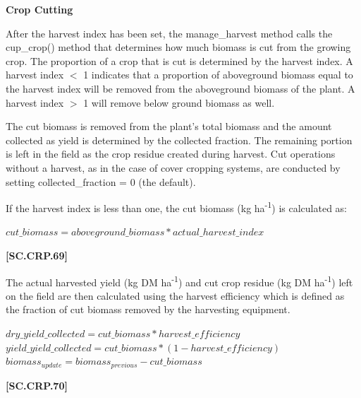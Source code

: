\textbf{Crop Cutting}
\vspace{0.2cm}

After the harvest index has been set, the manage\_harvest method calls the cup\_crop() method that determines how much biomass is cut from the growing crop. The proportion of a crop that is cut is determined by the harvest index. A harvest index \(<\) 1 indicates that a proportion of aboveground biomass equal to the harvest index will be removed from the aboveground biomass of the plant. A harvest index \(>\) 1 will remove below ground biomass as well.

The cut biomass is removed from the plant's total biomass and the amount collected as yield is determined by the collected fraction. The remaining portion is left in the field as the crop residue created during harvest. Cut operations without a harvest, as in the case of cover cropping systems, are conducted by setting collected\_fraction = 0 (the default).

If the harvest index is less than one, the cut biomass (kg ha\textsuperscript{-1}) is calculated as:
   \vspace{0.2cm}

    \begin{center}
        \(cut\_biomass=aboveground\_biomass * actual\_harvest\_index\) 
    \end{center}
        \vspace{0.5cm}
    
            {\raggedleft \textbf{[SC.CRP.69]}\par}
            \vspace{0.5cm}

The actual harvested yield (kg DM ha\textsuperscript{-1}) and cut crop residue (kg DM ha\textsuperscript{-1}) left on the field are then calculated using the harvest efficiency which is defined as the fraction of cut biomass removed by the harvesting equipment. 
   \vspace{0.2cm}

    \begin{center}
        \(dry\_yield\_collected=cut\_biomass * harvest\_efficiency\) \\ 
        \(yield\_yield\_collected=cut\_biomass * (1- harvest\_efficiency)\) \\ 
        \(biomass_{update}=biomass_{previous} - cut\_biomass\) 
    \end{center}
        \vspace{0.5cm}
    
            {\raggedleft \textbf{[SC.CRP.70]}\par}
            \vspace{0.5cm}

